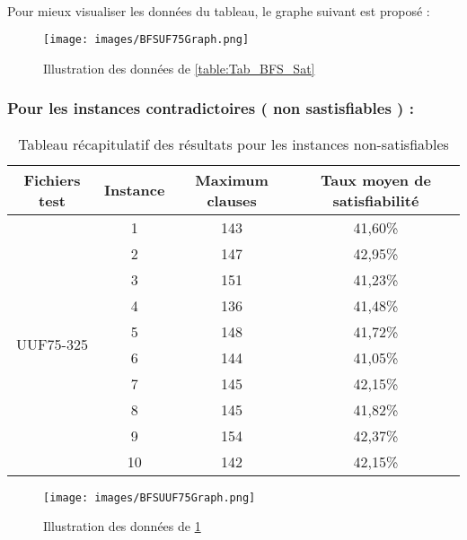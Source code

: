\paragraph{}Pour mieux visualiser les données du tableau, le graphe suivant est proposé :\\

\begin{figure}[H]
	\texttt{[image: images/BFSUF75Graph.png]}
	\caption{Illustration des données de \ref{table:Tab_BFS_Sat}}
\end{figure}
\newpage
\subsubsection{Pour les instances contradictoires ( non sastisfiables ) : }
\begin{table}[H]
	\centering
	\label{table:Tab_BFS_Non_Sat}
	\begin{tabular}{|c|c|c|c|}
		\hline
		Fichiers test               & Instance & Maximum clauses & Taux moyen de satisfiabilité \\ \hline
		\multirow{10}{*}{UUF75-325} & 1        & 143             & 41,60\%                      \\ \cline{2-4} 
		& 2        & 147             & 42,95\%                      \\ \cline{2-4} 
		& 3        & 151             & 41,23\%                      \\ \cline{2-4} 
		& 4        & 136             & 41,48\%                      \\ \cline{2-4} 
		& 5        & 148             & 41,72\%                      \\ \cline{2-4} 
		& 6        & 144             & 41,05\%                      \\ \cline{2-4} 
		& 7        & 145             & 42,15\%                      \\ \cline{2-4} 
		& 8        & 145             & 41,82\%                      \\ \cline{2-4} 
		& 9        & 154             & 42,37\%                      \\ \cline{2-4} 
		& 10       & 142             & 42,15\%                      \\ \hline
	\end{tabular}
	\caption{Tableau récapitulatif des résultats pour les instances non-satisfiables}
\end{table}
\begin{figure}[H]
	\texttt{[image: images/BFSUUF75Graph.png]}
	\caption{Illustration des données de \ref{table:Tab_BFS_Non_Sat}}
\end{figure}

